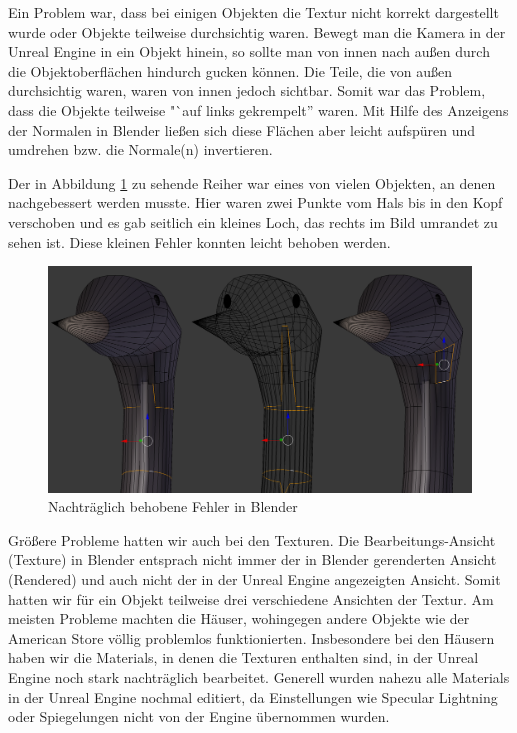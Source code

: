 \documentclass{Bericht}
\begin{document}
			Ein Problem war, dass bei einigen Objekten die Textur nicht korrekt dargestellt wurde oder Objekte teilweise durchsichtig waren. Bewegt man die Kamera in der Unreal Engine in ein Objekt hinein, so sollte man von innen nach außen durch die Objektoberflächen hindurch gucken können. Die Teile, die von außen durchsichtig waren, waren von innen jedoch sichtbar. Somit war das Problem, dass die Objekte teilweise "`auf links gekrempelt'' waren. Mit Hilfe des Anzeigens der Normalen in Blender ließen sich diese Flächen aber leicht aufspüren und umdrehen bzw. die Normale(n) invertieren.
			
			Der in Abbildung \ref{img:heron-error} zu sehende Reiher war eines von vielen Objekten, an denen nachgebessert werden musste. Hier waren zwei Punkte vom Hals bis in den Kopf verschoben und es gab seitlich ein kleines Loch, das rechts im Bild umrandet zu sehen ist. Diese kleinen Fehler konnten leicht behoben werden. 

		\begin{figure}[!htbp] %
			\centering
			\includegraphics[height=\textheight, width=\linewidth, keepaspectratio, angle=0]{../Bilder/Heron_Problem.png} %
			\caption{Nachträglich behobene Fehler in Blender}
			\label{img:heron-error}
		\end{figure}
			
			Größere Probleme hatten wir auch bei den Texturen. Die Bearbeitungs-Ansicht (Texture) in Blender entsprach nicht immer der in Blender gerenderten Ansicht (Rendered) und auch nicht der in der Unreal Engine angezeigten Ansicht. Somit hatten wir für ein Objekt teilweise drei verschiedene Ansichten der Textur. Am meisten Probleme machten die Häuser, wohingegen andere Objekte wie der American Store völlig problemlos funktionierten. Insbesondere bei den Häusern haben wir die Materials, in denen die Texturen enthalten sind, in der Unreal Engine noch stark nachträglich bearbeitet.
			Generell wurden nahezu alle Materials in der Unreal Engine nochmal editiert, da Einstellungen wie Specular Lightning oder Spiegelungen nicht von der Engine übernommen wurden.
			
\end{document}
